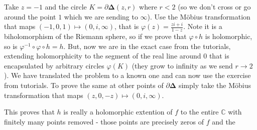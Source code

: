 \documentclass[a4paper, 12pt]{article} %
\newcommand{\C}{\mathbb{C}}
\begin{document}
\begin{enumerate}
Take $z = -1$ and the circle $K = \partial\mathbf{\Delta}(z, r)$ where $r < 2$ (so we don't cross or go around the point $1$ which we are sending to $\infty$). Use the M\"obius transformation that maps $(-1, 0, 1) \mapsto (0, i, \infty)$, that is $\varphi(z) = \frac{zi + i}{1 - z}$. Note it is a biholomorphism of the Riemann sphere, so if we prove that $\varphi\circ h$ is holomorphic, so is $\varphi^{-1}\circ\varphi\circ h = h$. But, now we are in the exact case from the tutorials, extending holomorphicity to the segment of the real line around $0$ that is encapsulated by arbitrary circles $\varphi(K)$ (they grow to infinity as we send $r \to 2$). We have translated the problem to a known one and can now use the exercise from tutorials. To prove the same at other points of $\partial\mathbf{\Delta}$ simply take the M\"obius transformation that maps $(z, 0, -z) \mapsto (0, i, \infty)$.
\end{enumerate}
This proves that $h$ is really a holomorphic extention of $f$ to the entire $\C$ with finitely many points removed - those points are precisely zeros of $f$ and the 
\end{document}
